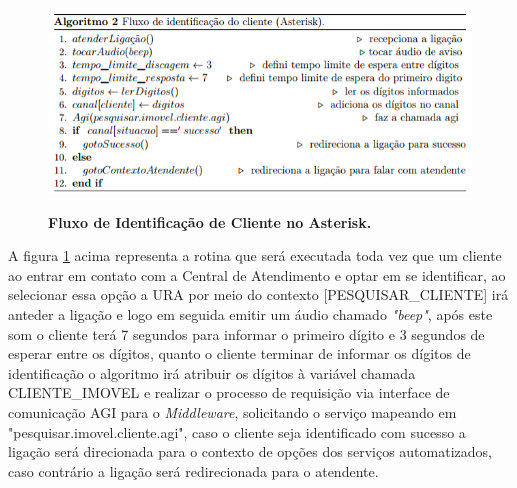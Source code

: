 


\begin{figure}[H]
	\caption{\textbf{Fluxo de Identificação de Cliente no Asterisk.}}	
	\label{figura:fluxoIdentificacaoClienteAsterisk}
	\includegraphics{figuras/algoritmo_2.png}
	\\[6pt]
	\fontsize{10}{12}\selectfont {Fonte: Autoria Própria.}
\end{figure}

A figura \ref{figura:fluxoIdentificacaoClienteAsterisk} acima representa a rotina que será executada toda vez que um cliente ao entrar em contato com a Central de Atendimento e optar em se identificar, ao selecionar essa opção a URA por meio do contexto [PESQUISAR\_CLIENTE] irá anteder a ligação e logo em seguida emitir um áudio chamado \textit{"beep"}, após este som o cliente terá 7 segundos para informar o primeiro dígito e 3 segundos de esperar entre os dígitos, quanto o cliente terminar de informar os dígitos de identificação o algoritmo irá atribuir os dígitos à variável chamada CLIENTE\_IMOVEL e realizar o processo de requisição via interface de comunicação AGI para o \textit{Middleware}, solicitando o serviço mapeando em "pesquisar.imovel.cliente.agi", caso o cliente seja identificado com sucesso a ligação será direcionada para o contexto de opções dos serviços automatizados, caso contrário a ligação será redirecionada para o atendente.

